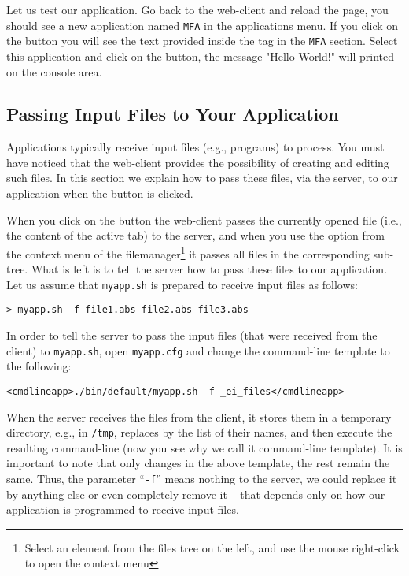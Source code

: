 Let us test our application. Go back to the web-client and reload the
page, you should see a new application named \texttt{MFA} in the
applications menu. If you click on the \helpbutton button you will see
the text provided inside the  tag in the \texttt{MFA}
section.
%
Select this application and click on the \applybutton button, the
message "Hello World!" will printed on the console area.


\subsection{Passing Input Files to Your Application}

Applications typically receive input files (e.g., programs) to
process. You must have noticed that the web-client provides the
possibility of creating and editing such files.  In this section we
explain how to pass these files, via the server, to our application
when the \applybutton button is clicked.

When you click on the \applybutton button the web-client passes the
currently opened file (i.e., the content of the active tab) to the
server, and when you use the \applybutton option from the context menu
of the filemanager\footnote{Select an element from the files tree on
  the left, and use the mouse right-click to open the context menu} it
passes all files in the corresponding sub-tree.
%
What is left is to tell the server how to pass these files to our
application. Let us assume that \texttt{myapp.sh} is prepared to
receive input files as follows:

\medskip
\begin{lstlisting}
> myapp.sh -f file1.abs file2.abs file3.abs
\end{lstlisting}

\medskip 
\noindent
In order to tell the server to pass the input files (that were
received from the client) to \texttt{myapp.sh}, open
\texttt{myapp.cfg} and change the command-line template to the
following:

\medskip
\begin{lstlisting}
<cmdlineapp>./bin/default/myapp.sh -f _ei_files</cmdlineapp>
\end{lstlisting}

\medskip
\noindent
When the server receives the files from the client, it stores them in
a temporary directory, e.g., in \texttt{/tmp}, replaces 
by the list of their names, and then execute the resulting
command-line (now you see why we call it command-line template).
%
It is important to note that only  changes in the above
template, the rest remain the same. Thus, the parameter
``\texttt{-f}'' means nothing to the server, we could replace it by
anything else or even completely remove it -- that depends only on how
our application is programmed to receive input files.

